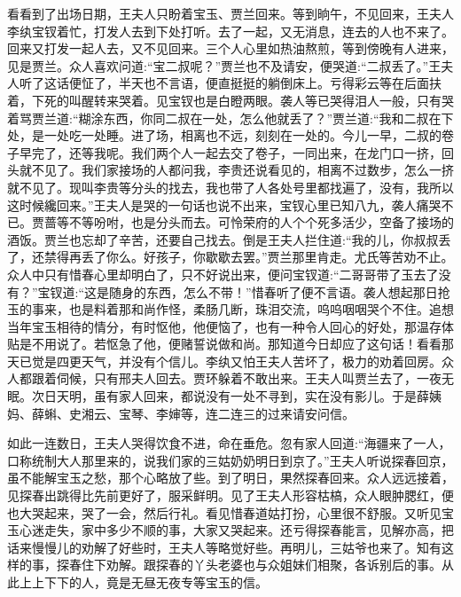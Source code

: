 \begin{parag}
    看看到了出场日期，王夫人只盼着宝玉、贾兰回来。等到晌午，不见回来，王夫人李纨宝钗着忙，打发人去到下处打听。去了一起，又无消息，连去的人也不来了。回来又打发一起人去，又不见回来。三个人心里如热油熬煎，等到傍晚有人进来，见是贾兰。众人喜欢问道:“宝二叔呢？”贾兰也不及请安，便哭道:“二叔丢了。”王夫人听了这话便怔了，半天也不言语，便直挺挺的躺倒床上。亏得彩云等在后面扶着，下死的叫醒转来哭着。见宝钗也是白瞪两眼。袭人等已哭得泪人一般，只有哭着骂贾兰道:“糊涂东西，你同二叔在一处，怎么他就丢了？”贾兰道:“我和二叔在下处，是一处吃一处睡。进了场，相离也不远，刻刻在一处的。今儿一早，二叔的卷子早完了，还等我呢。我们两个人一起去交了卷子，一同出来，在龙门口一挤，回头就不见了。我们家接场的人都问我，李贵还说看见的，相离不过数步，怎么一挤就不见了。现叫李贵等分头的找去，我也带了人各处号里都找遍了，没有，我所以这时候纔回来。”王夫人是哭的一句话也说不出来，宝钗心里已知八九，袭人痛哭不已。贾蔷等不等吩咐，也是分头而去。可怜荣府的人个个死多活少，空备了接场的酒饭。贾兰也忘却了辛苦，还要自己找去。倒是王夫人拦住道:“我的儿，你叔叔丢了，还禁得再丢了你么。好孩子，你歇歇去罢。”贾兰那里肯走。尤氏等苦劝不止。众人中只有惜春心里却明白了，只不好说出来，便问宝钗道:“二哥哥带了玉去了没有？”宝钗道:“这是随身的东西，怎么不带！”惜春听了便不言语。袭人想起那日抢玉的事来，也是料着那和尚作怪，柔肠几断，珠泪交流，呜呜咽咽哭个不住。追想当年宝玉相待的情分，有时怄他，他便恼了，也有一种令人回心的好处，那温存体贴是不用说了。若怄急了他，便赌誓说做和尚。那知道今日却应了这句话！看看那天已觉是四更天气，并没有个信儿。李纨又怕王夫人苦坏了，极力的劝着回房。众人都跟着伺候，只有邢夫人回去。贾环躲着不敢出来。王夫人叫贾兰去了，一夜无眠。次日天明，虽有家人回来，都说没有一处不寻到，实在没有影儿。于是薛姨妈、薛蝌、史湘云、宝琴、李婶等，连二连三的过来请安问信。
\end{parag}


\begin{parag}
    如此一连数日，王夫人哭得饮食不进，命在垂危。忽有家人回道:“海疆来了一人，口称统制大人那里来的，说我们家的三姑奶奶明日到京了。”王夫人听说探春回京，虽不能解宝玉之愁，那个心略放了些。到了明日，果然探春回来。众人远远接着，见探春出跳得比先前更好了，服采鲜明。见了王夫人形容枯槁，众人眼肿腮红，便也大哭起来，哭了一会，然后行礼。看见惜春道姑打扮，心里很不舒服。又听见宝玉心迷走失，家中多少不顺的事，大家又哭起来。还亏得探春能言，见解亦高，把话来慢慢儿的劝解了好些时，王夫人等略觉好些。再明儿，三姑爷也来了。知有这样的事，探春住下劝解。跟探春的丫头老婆也与众姐妹们相聚，各诉别后的事。从此上上下下的人，竟是无昼无夜专等宝玉的信。
\end{parag}


